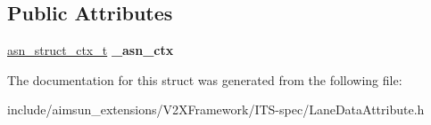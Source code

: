 \subsection*{Public Attributes}
\begin{DoxyCompactItemize}
\item 
\hyperlink{structasn__struct__ctx__s}{asn\+\_\+struct\+\_\+ctx\+\_\+t} {\bfseries \+\_\+asn\+\_\+ctx}\hypertarget{structLaneDataAttribute_1_1LaneDataAttribute__u_1_1LaneDataAttribute____regional_a43f348e91b7c1096390243fc51ed3b8d}{}\label{structLaneDataAttribute_1_1LaneDataAttribute__u_1_1LaneDataAttribute____regional_a43f348e91b7c1096390243fc51ed3b8d}

\end{DoxyCompactItemize}


The documentation for this struct was generated from the following file\+:\begin{DoxyCompactItemize}
\item 
include/aimsun\+\_\+extensions/\+V2\+X\+Framework/\+I\+T\+S-\/spec/Lane\+Data\+Attribute.\+h\end{DoxyCompactItemize}
